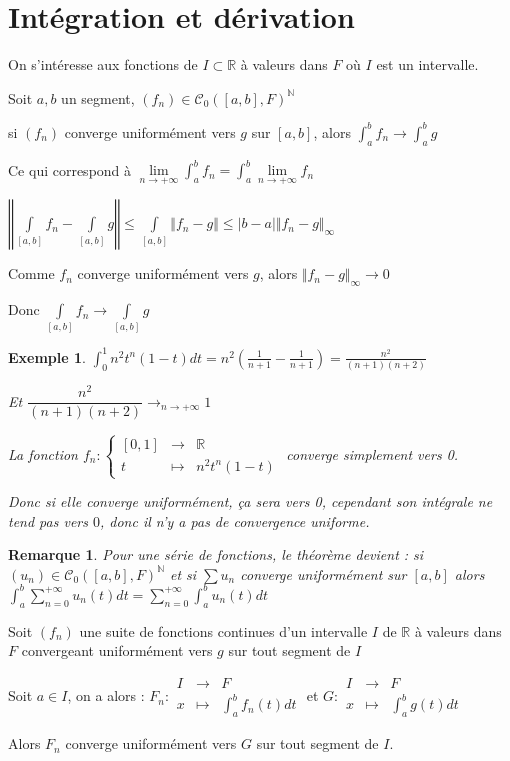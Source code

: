 \documentclass[a4paper,12pt]{book}
\newcommand{\Thr}[2]{\begin{tcolorbox}[sharp corners, colback=white,colframe=red!90!black!75, title=Théorème : #1]#2\end{tcolorbox}}
\newcommand{\Pre}[1]{\begin{tcolorbox}[sharp corners, colback=white,colframe=green!60!green!30!black!75, title=Preuve]#1\end{tcolorbox}}
\newtheorem{Exe}{Exemple}[section]
\newtheorem{Rem}{Remarque}[section]
\def\R{\mathbb{R}}
\def\N{\mathbb{N}}
\begin{document}
\section{Intégration et dérivation}
On s'intéresse aux fonctions de $I\subset\R$ à valeurs dans $F$ où $I$ est un intervalle.
\Thr{Intégration uniforme ou théorème d'échange limite-intégrale uniforme}{Soit ${a,b}$ un segment, $(f_n)\in\mathcal{C}_0([a,b],F)^\N$ \par si $(f_n)$ converge uniformément vers $g$ sur $[a,b]$, alors $\int_a^bf_n\to \int_a^bg$ \par Ce qui correspond à $\lim\limits_{n\to+\infty}\int_a^bf_n = \int_a^b\lim\limits_{n\to+\infty}f_n$}
\Pre{$\left\Vert\int\limits_{[a,b]}f_n-\int\limits_{[a,b]}g\right\Vert\leq \int\limits_{[a,b]}\Vert f_n-g\Vert\leq \vert b-a\vert\Vert f_n-g\Vert_\infty$ \par Comme $f_n$ converge uniformément vers $g$, alors $\Vert f_n-g\Vert_\infty\to 0$ \par Donc $\int\limits_{[a,b]}f_n\to\int\limits_{[a,b]}g$}
\begin{Exe}
$\int_0^1n^2t^n(1-t)dt = n^2(\frac{1}{n+1}-\frac{1}{n+1}) = \frac{n^2}{(n+1)(n+2)}$ \par Et $\dfrac{n^2}{(n+1)(n+2)}\to_{n\to +\infty} 1$ \par La fonction $f_n:\left\{\begin{array}{rcl} [0,1] & \to & \R \\ t & \mapsto & n^2t^n(1-t)\end{array}\right.$ converge simplement vers 0. \par Donc si elle converge uniformément, ça sera vers 0, cependant son intégrale ne tend pas vers $0$, donc il n'y a pas de convergence uniforme.
\end{Exe}
\begin{Rem}
Pour une série de fonctions, le théorème devient : si $(u_n)\in\mathcal{C}_0([a,b],F)^\N$ et si $\sum u_n$ converge uniformément sur $[a,b]$ alors $\int_a^b\sum\limits_{n=0}^{+\infty}u_n(t)dt = \sum\limits_{n=0}^{+\infty}\int_a^bu_n(t)dt$
\end{Rem}
\Thr{}{Soit $(f_n)$ une suite de fonctions continues d'un intervalle $I$ de $\R$ à valeurs dans $F$ convergeant uniformément vers $g$ sur tout segment de $I$ \par Soit $a\in I$, on a alors : $F_n:\begin{array}{rcl}I & \to & F \\ x & \mapsto & \int_a^bf_n(t)dt\end{array}$ et $G:\begin{array}{rcl}I & \to & F \\ x & \mapsto & \int_a^bg(t)dt\end{array}$ \par Alors $F_n$ converge uniformément vers $G$ sur tout segment de $I$.}
\end{document}
